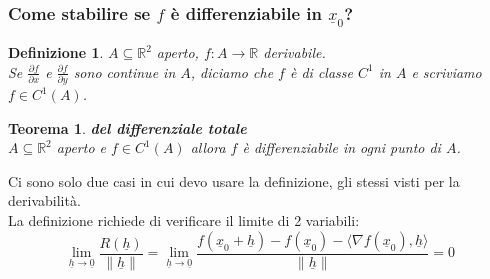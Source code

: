 \documentclass{scrreprt}
\newtheorem{defn}{Definizione}
\newenvironment{definition}{\begin{mdframed}[backgroundcolor=Ivory2]\begin{defn}}{\end{defn}\end{mdframed}}
\newtheorem{teorema}{Teorema}
\newenvironment{thm}{\begin{mdframed}[backgroundcolor=Ivory2]\begin{teorema}}{\end{teorema}\end{mdframed}}
\begin{document}
\subsubsection{Come stabilire se $f$ è differenziabile in $\underline{x}_0$?}
\begin{definition}
	$A \subseteq \mathbb{R}^2$ aperto, $f: A \to \mathbb{R}$ derivabile.\\
	Se $\frac{\partial f}{\partial x}$ e $\frac{\partial f}{\partial y}$ sono continue in $A$, diciamo che $f$ è di classe $C^1$ in $A$ e scriviamo $f \in C^1(A)$.
\end{definition}
\begin{thm} \textbf{del differenziale totale}\\
	$A \subseteq \mathbb{R}^2$ aperto e $f \in C^1(A)$ allora $f$ è differenziabile in ogni punto di $A$.
\end{thm}
Ci sono solo due casi in cui devo usare la definizione, gli stessi visti per la derivabilità.\\
La definizione richiede di verificare il limite di 2 variabili:
\begin{equation}
	\lim_{\underline{h} \to \underline{0}} \frac{R(\underline{h})}{\left\lVert \underline{h} \right\rVert } = \lim_{\underline{h} \to \underline{0}} \frac{f (\underline{x}_0 + \underline{h}) - f(\underline{x}_0) - \langle \nabla f(\underline{x}_0), \underline{h} \rangle}{\left\lVert \underline{h} \right\rVert } = 0
\end{equation}
\end{document}
